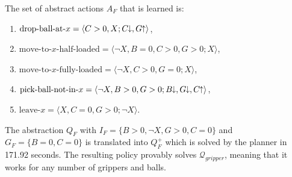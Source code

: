 \documentclass[letterpaper]{article} %
\newcommand{\Omit}[1]{}
\newcommand{\tup}[1]{\langle #1 \rangle}
\newcommand{\Q}{\mathcal{Q}}
\newcommand{\abst}[2]{\tup{#1;#2}}
\newcommand{\pplus}{\hspace{-.05em}\raisebox{.15ex}{\footnotesize$\uparrow$}}
\newcommand{\mminus}{\hspace{-.05em}\raisebox{.15ex}{\footnotesize$\downarrow$}}
\begin{document}
\noindent The set of  abstract actions $A_F$  that is learned is:

\begin{enumerate}[--]
  \item $\text{drop-ball-at-$x$}=\abst{C>0, X}{C\mminus, G \pplus}$,
  \item $\text{move-to-$x$-half-loaded}\! =\!  \abst{\neg X, B=0, C>0, G\!>\!0}{X}$,
  \item $\text{move-to-$x$-fully-loaded} = \abst{\neg X, C>0, G=0}{X}$,
  \item $\text{pick-ball-not-in-$x$} = \abst{\neg X, B > 0, G > 0}{B\mminus, G\mminus, C\pplus}$,
  \item $\text{leave-$x$} = \abst{X, C=0, G > 0}{\neg X}$.
\end{enumerate}

The abstraction $Q_F$ with $I_F\!=\!\{ B\!>\!0, \neg X, G\!>\!0, C\!=\!0\}$ and $G_F\!=\!\{ B\!=\!0, C\!=\!0 \}$ is
translated into $Q^+_F$ which is solved by the planner in 171.92 seconds.
The resulting policy provably solves $\Q_{gripper}$, meaning that
it works for any  number of grippers and balls.
\Omit{ %
The policy picks the balls in the source room, one by one,
until the grippers are full or there are no more balls.
It then moves to the target room, with one of the two move actions above,
according to whether the grippers are fully loaded or not,
and then drops the balls one by one, until the grippers
are all empty.  It then moves back to the other room if there
are still  balls to be moved, repeating the process.
}

\end{document}

